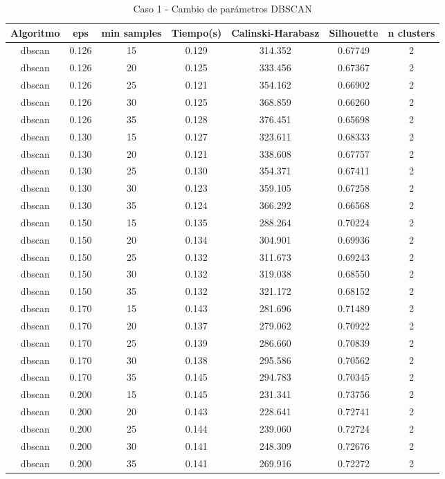 \begin{table}[H]
\centering
\caption{Caso 1 - Cambio de parámetros DBSCAN}
\label{tab:c1_dbscan}
\begin{tabular}{ccccccc}
\toprule
Algoritmo & eps & min samples & Tiempo(s) & Calinski-Harabasz & Silhouette & n clusters \\
\midrule
dbscan & 0.126 & 15 & 0.129 & 314.352 & 0.67749 & 2 \\
dbscan & 0.126 & 20 & 0.125 & 333.456 & 0.67367 & 2 \\
dbscan & 0.126 & 25 & 0.121 & 354.162 & 0.66902 & 2 \\
dbscan & 0.126 & 30 & 0.125 & 368.859 & 0.66260 & 2 \\
dbscan & 0.126 & 35 & 0.128 & 376.451 & 0.65698 & 2 \\
dbscan & 0.130 & 15 & 0.127 & 323.611 & 0.68333 & 2 \\
dbscan & 0.130 & 20 & 0.121 & 338.608 & 0.67757 & 2 \\
dbscan & 0.130 & 25 & 0.130 & 354.371 & 0.67411 & 2 \\
dbscan & 0.130 & 30 & 0.123 & 359.105 & 0.67258 & 2 \\
dbscan & 0.130 & 35 & 0.124 & 366.292 & 0.66568 & 2 \\
dbscan & 0.150 & 15 & 0.135 & 288.264 & 0.70224 & 2 \\
dbscan & 0.150 & 20 & 0.134 & 304.901 & 0.69936 & 2 \\
dbscan & 0.150 & 25 & 0.132 & 311.673 & 0.69243 & 2 \\
dbscan & 0.150 & 30 & 0.132 & 319.038 & 0.68550 & 2 \\
dbscan & 0.150 & 35 & 0.132 & 321.172 & 0.68152 & 2 \\
dbscan & 0.170 & 15 & 0.143 & 281.696 & 0.71489 & 2 \\
dbscan & 0.170 & 20 & 0.137 & 279.062 & 0.70922 & 2 \\
dbscan & 0.170 & 25 & 0.139 & 286.660 & 0.70839 & 2 \\
dbscan & 0.170 & 30 & 0.138 & 295.586 & 0.70562 & 2 \\
dbscan & 0.170 & 35 & 0.145 & 294.783 & 0.70345 & 2 \\
dbscan & 0.200 & 15 & 0.145 & 231.341 & 0.73756 & 2 \\
dbscan & 0.200 & 20 & 0.143 & 228.641 & 0.72741 & 2 \\
dbscan & 0.200 & 25 & 0.144 & 239.060 & 0.72724 & 2 \\
dbscan & 0.200 & 30 & 0.141 & 248.309 & 0.72676 & 2 \\
dbscan & 0.200 & 35 & 0.141 & 269.916 & 0.72272 & 2 \\
\bottomrule
\end{tabular}
\end{table}

